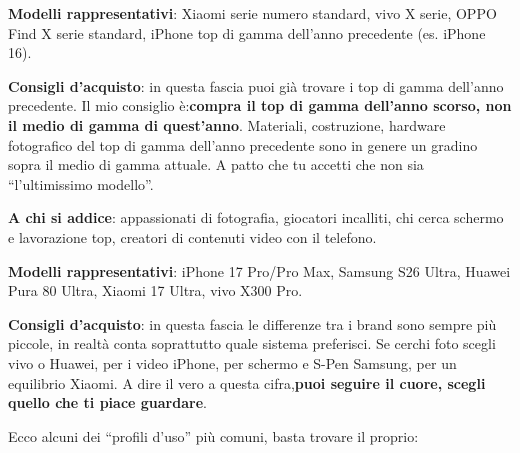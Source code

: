 \textbf{Modelli rappresentativi}: Xiaomi serie numero standard, vivo X serie, OPPO Find X serie standard, iPhone top di gamma dell'anno precedente (es. iPhone 16).

\textbf{Consigli d'acquisto}: in questa fascia puoi già trovare i top di gamma dell'anno precedente. Il mio consiglio è:\textbf{compra il top di gamma dell'anno scorso, non il medio di gamma di quest'anno}. Materiali, costruzione, hardware fotografico del top di gamma dell'anno precedente sono in genere un gradino sopra il medio di gamma attuale. A patto che tu accetti che non sia “l'ultimissimo modello”.


\textbf{A chi si addice}: appassionati di fotografia, giocatori incalliti, chi cerca schermo e lavorazione top, creatori di contenuti video con il telefono.

\textbf{Modelli rappresentativi}: iPhone 17 Pro/Pro Max, Samsung S26 Ultra, Huawei Pura 80 Ultra, Xiaomi 17 Ultra, vivo X300 Pro.

\textbf{Consigli d'acquisto}: in questa fascia le differenze tra i brand sono sempre più piccole, in realtà conta soprattutto quale sistema preferisci. Se cerchi foto scegli vivo o Huawei, per i video iPhone, per schermo e S-Pen Samsung, per un equilibrio Xiaomi. A dire il vero a questa cifra,\textbf{puoi seguire il cuore, scegli quello che ti piace guardare}.


Ecco alcuni dei “profili d'uso” più comuni, basta trovare il proprio:

